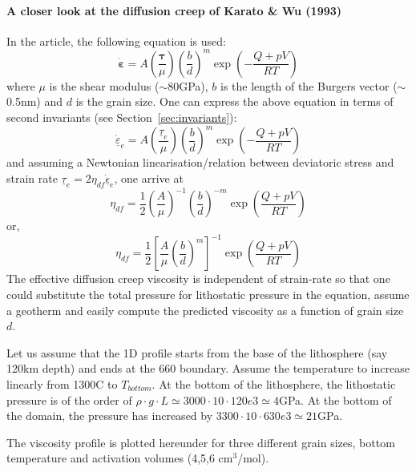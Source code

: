 \paragraph{A closer look at the diffusion creep of Karato \& Wu (1993)} In the article, the following equation 
is used: 
\[
\dot{\bm \varepsilon} = A \left(\frac{{\bm \tau}}{\mu}\right) \left(\frac{b}{d}\right)^m \exp \left( -\frac{Q+pV}{RT}\right)
\]
where $\mu$ is the shear modulus ($\sim$80GPa), $b$ is the length of the Burgers vector ($\sim$0.5nm) and 
$d$ is the grain size.
One can express the above equation in terms of second invariants (see Section~\ref{sec:invariants}):
\[
\underline{\dot{\varepsilon}}_{e} 
= A \left(\frac{\underline{\tau}_{e}}{\mu}\right) \left(\frac{b}{d}\right)^m \exp\left( -\frac{Q+pV}{RT} \right)
\]
and assuming a Newtonian linearisation/relation between deviatoric stress 
and strain rate  $\underline{\tau}_{e} = 2 \eta_{df} \underline{\dot\epsilon}_{e}$, one arrive at
\[
\eta_{df} = \frac{1}{2} \left(\frac{A}{\mu}\right)^{-1}  \left(\frac{b}{d}\right)^{-m} \exp\left( \frac{Q+pV}{RT} \right)
\]
or, 
\[
\eta_{df} = \frac{1}{2} \left[ \frac{A}{\mu}   \left(\frac{b}{d}\right)^{m} \right]^{-1} \exp\left( \frac{Q+pV}{RT} \right)
\]
The effective diffusion creep viscosity is independent of strain-rate so that one 
could substitute the total pressure for lithostatic pressure in the equation, assume 
a geotherm and easily compute the predicted viscosity as a function of grain size $d$.

Let us assume that the 1D profile starts from the base of the lithosphere 
(say 120km depth) and ends at the 660 boundary. 
Assume the temperature to increase linearly from 1300\degree C to $T_{bottom}$. At the bottom 
of the lithosphere, the lithostatic pressure is of the order of 
$\rho \cdot g \cdot L \simeq 3000\cdot 10 \cdot 120e3 \simeq 4$GPa. 
At the bottom of the domain, the pressure has increased by $3300\cdot 10 \cdot 630e3 \simeq21$GPa. 

The viscosity profile is plotted hereunder for three different grain sizes, bottom temperature and 
activation volumes (4,5,6 cm$^3$/mol). 

